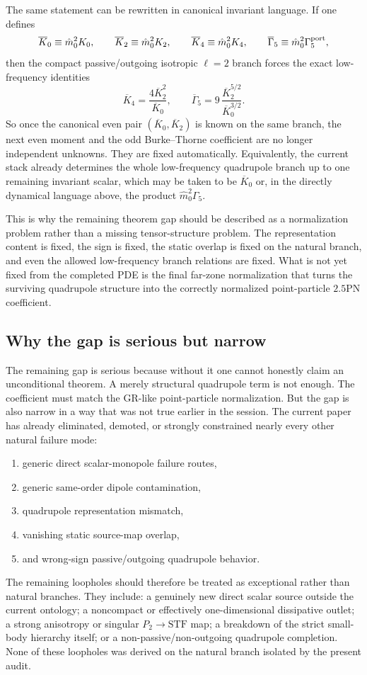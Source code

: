 \documentclass[11pt]{article}
\begin{document}
The same statement can be rewritten in canonical invariant language.  If one
defines
\[
\overline K_0\equiv \hat m_0^2K_0,
\qquad
\overline K_2\equiv \hat m_0^2K_2,
\qquad
\overline K_4\equiv \hat m_0^2K_4,
\qquad
\overline\Gamma_5\equiv \hat m_0^2\Gamma_5^{\rm port},
\]
then the compact passive/outgoing isotropic $\ell=2$ branch forces the exact
low-frequency identities
\[
\overline K_4=\frac{4\overline K_2^2}{\overline K_0},
\qquad
\overline\Gamma_5
=
9\,\frac{\overline K_2^{5/2}}{\overline K_0^{3/2}}.
\]
So once the canonical even pair $(\overline K_0,\overline K_2)$ is known on the
same branch, the next even moment and the odd Burke--Thorne coefficient are no
longer independent unknowns.  They are fixed automatically.  Equivalently, the
current stack already determines the whole low-frequency quadrupole branch up to
one remaining invariant scalar, which may be taken to be $\overline K_0$ or,
in the directly dynamical language above, the product $\hat m_0^2\Gamma_5$.

This is why the remaining theorem gap should be described as a normalization
problem rather than a missing tensor-structure problem.  The representation
content is fixed, the sign is fixed, the static overlap is fixed on the natural
branch, and even the allowed low-frequency branch relations are fixed.  What is
not yet fixed from the completed PDE is the final far-zone normalization that
turns the surviving quadrupole structure into the correctly normalized
point-particle $2.5$PN coefficient.

\subsection{Why the gap is serious but narrow}
\label{sec:conditional-theorem-gap-narrow}

The remaining gap is serious because without it one cannot honestly claim an
unconditional theorem.  A merely structural quadrupole term is not enough.  The
coefficient must match the GR-like point-particle normalization.  But the gap is
also narrow in a way that was not true earlier in the session.  The current
paper has already eliminated, demoted, or strongly constrained nearly every
other natural failure mode:
\begin{enumerate}
  \item generic direct scalar-monopole failure routes,
  \item generic same-order dipole contamination,
  \item quadrupole representation mismatch,
  \item vanishing static source-map overlap,
  \item and wrong-sign passive/outgoing quadrupole behavior.
\end{enumerate}
The remaining loopholes should therefore be treated as exceptional rather than
natural branches.  They include: a genuinely new direct scalar source outside
the current ontology; a noncompact or effectively one-dimensional dissipative
outlet; a strong anisotropy or singular $P_2\to\mathrm{STF}$ map; a breakdown of
the strict small-body hierarchy itself; or a non-passive/non-outgoing quadrupole
completion.  None of these loopholes was derived on the natural branch isolated
by the present audit.
\end{document}
